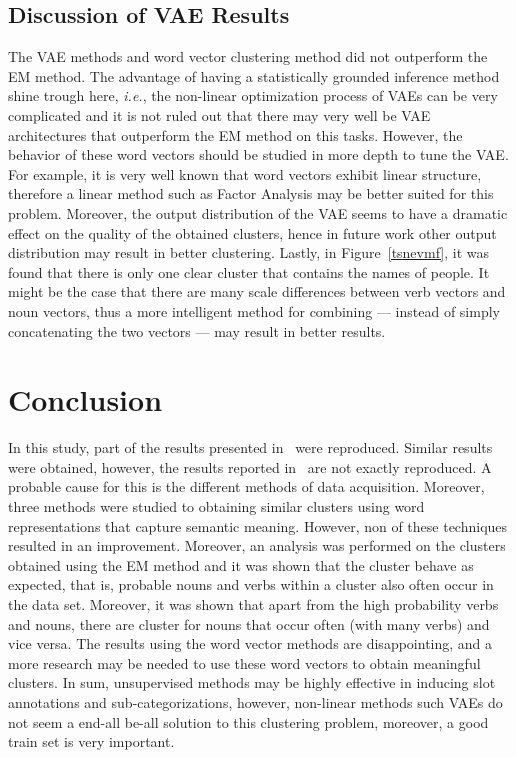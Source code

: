 \documentclass[11pt]{scrartcl}
\newcommand{\ie}{\textit{i.e.}}
\begin{document}
\subsection{Discussion of VAE Results}
The VAE methods and word vector clustering method did not outperform
the EM method.  The advantage of having a statistically grounded
inference method shine trough here, \ie, the non-linear optimization
process of VAEs can be very complicated and it is not ruled out that
there may very well be VAE architectures that outperform the EM method
on this tasks. However, the behavior of these word vectors should be
studied in more depth to tune the VAE. For example, it is very well
known that word vectors exhibit linear structure, therefore a linear
method such as Factor Analysis may be better suited for this
problem. Moreover, the output distribution of the VAE seems to have a
dramatic effect on the quality of the obtained clusters, hence in
future work other output distribution may result in better
clustering. Lastly, in Figure~\ref{tsnevmf}, it was found that there
is only one clear cluster that contains the names of people. It might be
the case that there are many scale differences between verb vectors
and noun vectors, thus a more intelligent method for combining --- instead
of simply concatenating the two vectors --- may result in better results.

\section{Conclusion} %
In this study, part of the results presented
in~\cite{rooth1999inducing} were reproduced. Similar results were
obtained, however, the results reported in~\cite{rooth1999inducing}
are not exactly reproduced. A probable cause for this is the different
methods of data acquisition. Moreover, three methods were studied to
obtaining similar clusters using word representations that capture
semantic meaning. However, non of these techniques resulted in an
improvement.  Moreover, an analysis was performed on the clusters
obtained using the EM method and it was shown that the cluster behave
as expected, that is, probable nouns and verbs within a cluster also
often occur in the data set. Moreover, it was shown that apart from
the high probability verbs and nouns, there are cluster for nouns that
occur often (with many verbs) and vice versa. The results using the
word vector methods are disappointing, and a more research may be
needed to use these word vectors to obtain meaningful clusters.  In
sum, unsupervised methods may be highly effective in inducing slot
annotations and sub-categorizations, however, non-linear methods such
VAEs do not seem a end-all be-all solution to this clustering problem,
moreover, a good train set is very important.
\end{document}
